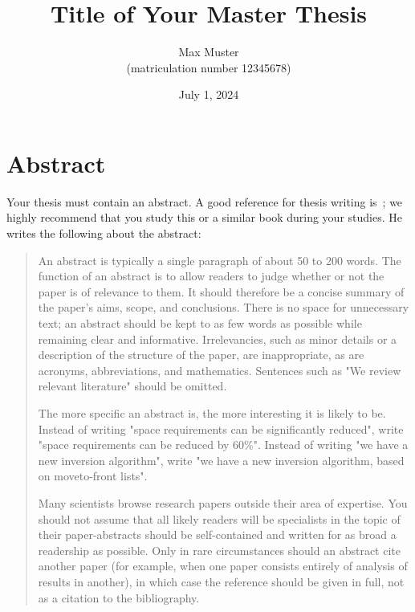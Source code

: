 \documentclass[a4paper,oneside,bibliography=totoc]{scrbook}
\begin{document}
\frontmatter \subject{Master Thesis} %
\title{Title of Your Master Thesis}
\author{Max Muster\\
  (matriculation number 12345678)} \date{July 1, 2024}
\publishers{{\small Submitted to}\\
  Data and Web Science Group\\
  Prof.\ Dr.\ Right-Name-Here\\
  University of Mannheim\\}
\maketitle

\chapter{Abstract}

Your thesis must contain an abstract. A good reference for thesis writing
is~\citet{zobel2014}; we highly recommend that you study this or a similar book
during your studies. He writes the following about the abstract:

\blockcquote{zobel2004}{%
  An abstract is typically a single paragraph of about 50 to 200 words. The
  function of an abstract is to allow readers to judge whether or not the paper
  is of relevance to them. It should therefore be a concise summary of the
  paper's aims, scope, and conclusions. There is no space for unnecessary text;
  an abstract should be kept to as few words as possible while remaining clear
  and informative. Irrelevancies, such as minor details or a description of the
  structure of the paper, are inappropriate, as are acronyms, abbreviations, and
  mathematics. Sentences such as "We review relevant literature" should be
  omitted.

  The more specific an abstract is, the more interesting it is likely to be.
  Instead of writing "space requirements can be significantly reduced", write
  "space requirements can be reduced by 60\%". Instead of writing "we have a new
  inversion algorithm", write "we have a new inversion algorithm, based on
  move­to-front lists".

  Many scientists browse research papers outside their area of expertise. You
  should not assume that all likely readers will be specialists in the topic of
  their paper-abstracts should be self-contained and written for as broad a
  readership as possible. Only in rare circumstances should an abstract cite
  another paper (for example, when one paper consists entirely of analysis of
  results in another), in which case the reference should be given in full, not
  as a citation to the bibliography.}
\end{document}
